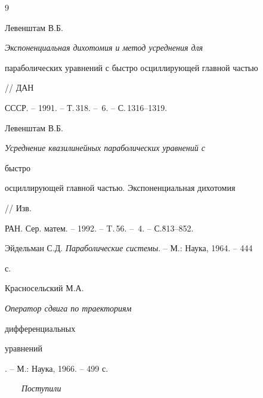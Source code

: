 \begin{thebibliography}{9} 


 




Левенштам В.Б. {\em Экспоненциальная дихотомия и метод усреднения для 


параболических уравнений с быстро осциллирующей главной частью} // ДАН 


СССР. -- 1991. -- Т.\,318. -- \No\,6. -- С.\,1316--1319. 




Левенштам В.Б. {\em Усреднение квазилинейных параболических уравнений с 


быстро 


осциллирующей главной частью. Экспоненциальная дихотомия} // Изв. 


РАН. Сер. матем. -- 1992. -- T.\,56. -- \No\,4. -- С.\.813--852. 




Эйдельман С.Д. {\em Параболические системы}. -- М.: Наука, 1964. -- 444 


с. 




Красносельский М.А. {\em Оператор сдвига по траекториям 


дифференциальных 


уравнений}. -- М.: Наука, 1966. -- 499 с. 


 


\end{thebibliography} 


 


\vskip 2cm 


 


% 


{$\qquad$\it Поступили} 






 


\label{end} 


 





